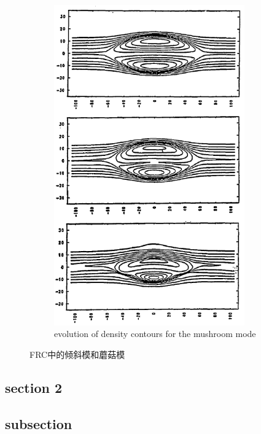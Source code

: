 \documentclass{article}
\begin{document}
\begin{figure}[!hbtp]
\begin{subfigure}[b]{0.45\textwidth}
    \includegraphics[width=0.9\textwidth]{figs/mushroom.png}
    \caption{evolution of density contours for the mushroom mode}
    \label{fig: mushroom}
    \end{subfigure}
    \caption{FRC中的倾斜模和蘑菇模\cite{staudenmeier1991fluid}}
    \label{fig: tilt and mushroom}
\end{figure}



\subsection{section 2}



\subsection{subsection}
\end{document}
